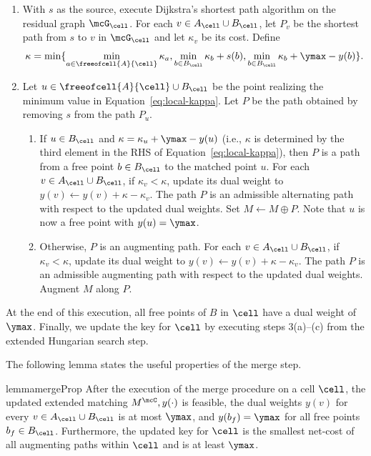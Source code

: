 \begin{enumerate}
    \item With $s$ as the source, execute Dijkstra's shortest path algorithm on the residual graph $\mcG_\cell$. For each $v \in A_\cell\cup B_\cell$, let $P_v$ be the shortest path from $s$ to $v$ in $\mcG_\cell$ and let $\kappa_v$ be its cost. Define
\begin{equation}\label{eq:local-kappa}
    \kappa = \min\{ \min_{a\in \freeofcell{A}{\cell}}\kappa_a, \min_{b\in B_\cell}\kappa_b + s(b), \min_{b\in B_\cell}\kappa_b + \ymax - y(b)\}.
\end{equation}


\item Let $u\in\freeofcell{A}{\cell}\cup B_\cell$ be the point realizing the minimum value in Equation~\eqref{eq:local-kappa}. Let $P$ be the path obtained by removing $s$ from the path $P_u$.
\begin{enumerate}
    \item If $u\in B_\cell$ and $\kappa=\kappa_u+\ymax-y(u)$ (i.e., $\kappa$ is determined by the third element in the RHS of Equation~\eqref{eq:local-kappa}), then $P$ is a path from a free point $b\in B_\cell$ to the matched point $u$. For each $v \in A_\cell\cup B_\cell$, if $\kappa_v < \kappa$, update its dual weight to $y(v)\leftarrow y(v)+\kappa - \kappa_v$. The path $P$ is an admissible alternating path with respect to the updated dual weights. Set $M\leftarrow M\oplus P$. Note that $u$ is now a free point with $y(u)=\ymax$.
    \item Otherwise, $P$ is an augmenting path. For each $v \in A_\cell\cup B_\cell$, if $\kappa_v < \kappa$, update its dual weight to $y(v)\leftarrow y(v)+\kappa - \kappa_v$. The path $P$ is an admissible augmenting path with respect to the updated dual weights. Augment $M$ along $P$.
\end{enumerate}
\end{enumerate}
At the end of this execution, all free points of $B$ in $\cell$ have a dual weight of $\ymax$. Finally, we update the key for $\cell$ by executing steps 3(a)--(c) from the extended Hungarian search step. 



The following lemma states the useful properties of the merge step.

\begin{restatable}{lemma}{mergeProp}\label{lemma:merge_properties}
After the execution of the merge procedure on a cell $\cell$,
the updated extended matching $M^{\mcC}, y(\cdot)$ is feasible, the dual weights $y(v)$ for every $v \in A_\cell\cup B_\cell$ is at most $\ymax$, and $y(b_f)=\ymax$ for all free points $b_f\in B_\cell$. Furthermore, the updated key for $\cell$ is the smallest net-cost of all augmenting paths within $\cell$ and is at least $\ymax$.
\end{restatable}










